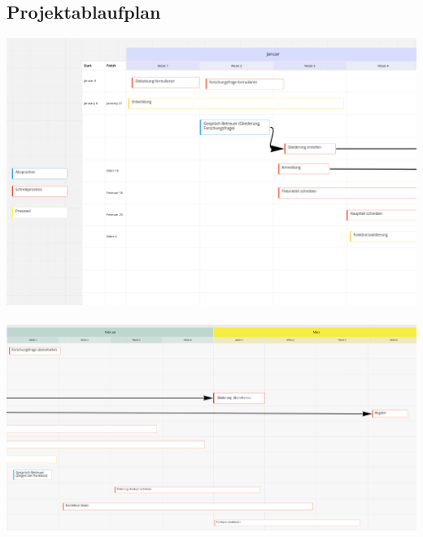 \subsection{Projektablaufplan}
\includegraphics[scale=0.7, angle=270]{Hausaufgaben/9_Projektskizze_BA/Monat_1}\\\\
\includegraphics[scale=0.7, angle=270]{Hausaufgaben/9_Projektskizze_BA/Monat_2+3}
